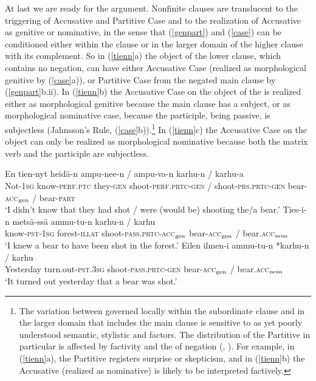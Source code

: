\documentclass[output=paper,
modfonts
]{LSP/langsci}
\newcommand{\rf}[1]{(\ref{#1})}
\newcommand{\rfa}[2]{(\ref{#1}{#2})}
\def\trf#1{$_{\textrm{\scriptsize{#1}}}$}
\begin{document}
At last we are ready for the argument.  Nonfinite  clauses are translucent to the
triggering of Accusative and Partitive Case and to the realization of Accusative  as
genitive or nominative, in the sense that \rf{genpart} and \rf{case} can be conditioned
either within the  clause or in the larger domain of the higher clause with its 
complement.
So in \rfa{tienn}{a} the object of the lower clause, which contains no negation, can have
either Accusative Case (realized as morphological genitive  by \rfa{case}{a}), or Partitive
Case from the negated main clause by \rfa{genpart}{b.ii}. In \rfa{tienn}{b} the 
Accusative Case on the object of the  is realized either as morphological genitive 
because the main clause has a subject, or as morphological nominative case, because the
participle, being passive, is subjectless (Jahnsson's Rule, \rfa{case}{b}).\footnote{The
  variation between  governed locally within the subordinate clause and in the larger
  domain that includes the main clause is sensitive to as yet poorly understood semantic,
  stylistic and  factors.  The distribution of the Partitive in particular is affected
  by factivity and the  of negation (\citealt[31]{hakulinen1970}, \citealt[365]{hakulinen1979}).  For example, in
  \rfa{tienn}{a}, the Partitive registers surprise or skepticism, and in \rfa{tienn}{b} the
  Accusative (realized as nominative) is likely to be interpreted factively.} In
\rfa{tienn}{c} the  Accusative Case on the object can only be realized as
morphological nominative  because both the matrix verb and the participle are subjectless.
\begin{exe}
\ex\label{tienn}
	\ea \gll  En tien-nyt heidä-n ampu-nee-n / ampu-va-n karhu-n / karhu-a \hfill \\
		Not-\textsc{1sg} know-\textsc{perf}.\textsc{ptc} they-\textsc{gen} shoot-\textsc{perf}.\textsc{prtc}-\textsc{gen} / 
		shoot-\textsc{prs}.\textsc{prtc}-\textsc{gen} bear-\textsc{acc\trf{gen}} / bear-\textsc{part} \\
		\glt `I didn't know that they had shot / were (would be) shooting the/a bear.' 
	\ex   \gll Ties-i-n metsä-ssä ammu-tu-n  karhu-n / karhu\\
  		know-\textsc{pst}-\textsc{1sg} forest-\textsc{illat}  shoot-\textsc{pass}.\textsc{prtc}-\textsc{acc\trf{gen}}
  		bear-\textsc{acc\trf{gen}}  / bear.\textsc{acc\trf{nom}}\\ 
  		\glt `I knew a bear to have been shot in the forest.'\hfill 
 	\ex \gll Eilen ilmen-i ammu-tu-n *karhu-n / karhu\\
		Yesterday turn.out-\textsc{pst}.\textsc{3sg}  shoot-\textsc{pass}.\textsc{prtc}-\textsc{gen} bear-\textsc{acc\trf{gen}} / bear.\textsc{acc\trf{nom}}\\
		\glt `It turned out yesterday that a bear was shot.'
	\z 
\end{exe}
\end{document}
